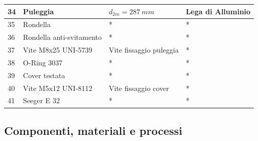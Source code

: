 \begin{tabular}{|l|l|l|l|}
\hline
34&Puleggia&$d_{2m}=287\ mm$&Lega di Alluminio\\
\hline
35&Rondella&*&*\\
\hline
36&Rondella anti-svitamento&*&*\\
\hline
37&Vite M8x25 UNI-5739&Vite fissaggio puleggia&*\\
\hline
38&O-Ring 3037&*&*\\
\hline
39&Cover testata&*&*\\
\hline
40&Vite M5x12 UNI-8112&Vite fissaggio cover&*\\
\hline
41&Seeger E 32&*&*\\
\hline
\end{tabular}

\subsection{Componenti, materiali e processi}
